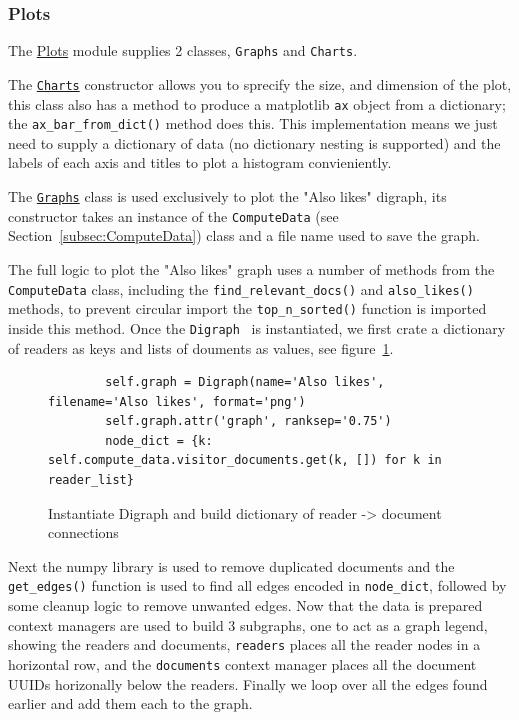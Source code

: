 \documentclass[11pt]{article}
\newcommand{\code}[1]{\colorbox{light-gray}{\texttt{#1}}}
\begin{document}
\subsubsection{Plots}
The \href{https://www2.macs.hw.ac.uk/~sf52/DocuTrace/html/DocuTrace.Analysis.html#module-DocuTrace.Analysis.Plots}{Plots} module supplies 2 classes, \code{Graphs} and \code{Charts}. 

The \href{https://www2.macs.hw.ac.uk/~sf52/DocuTrace/html/DocuTrace.Analysis.html#DocuTrace.Analysis.Plots.Charts}{\code{Charts}} constructor allows you to sprecify the size, and dimension of the plot, this class also has a method to produce a matplotlib \code{ax} object from a dictionary; the \code{ax\_bar\_from\_dict()} method does this. 
This implementation means we just need to supply a dictionary of data (no dictionary nesting is supported) and the labels of each axis and titles to plot a histogram convieniently.

The \href{https://www2.macs.hw.ac.uk/~sf52/DocuTrace/html/DocuTrace.Analysis.html#DocuTrace.Analysis.Plots.Graphs}{\code{Graphs}} class is used exclusively to plot the "Also likes" digraph, its constructor takes an instance of the \code{ComputeData} (see Section~\ref{subsec:ComputeData}) class and a file name used to save the graph.

The full logic to plot the "Also likes" graph uses a number of methods from the \code{ComputeData} class, including the \code{find\_relevant\_docs()} and \code{also\_likes()} methods, to prevent circular import the \code{top\_n\_sorted()} function is imported inside this method.
Once the \code{Digraph}~\autocite{APIReferenceGraphviz} is instantiated, we first crate a dictionary of readers as keys and lists of douments as values, see figure~\ref{fig:nodeDict}.

\begin{figure}[h]
    \begin{verbatim}
        self.graph = Digraph(name='Also likes', filename='Also likes', format='png')
        self.graph.attr('graph', ranksep='0.75')
        node_dict = {k: self.compute_data.visitor_documents.get(k, []) for k in reader_list}
    \end{verbatim}
    \caption{Instantiate Digraph and build dictionary of reader -> document connections}
    \label{fig:nodeDict}
\end{figure}

Next the numpy library is used to remove duplicated documents and the \code{get\_edges()} function is used to find all edges encoded in \code{node\_dict}, followed by some cleanup logic to remove unwanted edges.
Now that the data is prepared context managers are used to build 3 subgraphs, one to act as a graph legend, showing the readers and documents, \code{readers} places all the reader nodes in a horizontal row, and the \code{documents} context manager places all the document UUIDs horizonally below the readers.
Finally we loop over all the edges found earlier and add them each to the graph.
\end{document}
